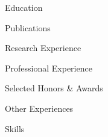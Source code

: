 \documentclass[11pt]{resume}
\begin{document}
\begin{rSection}{Education}
\end{rSection}

\begin{rSection}{Publications}
\end{rSection}


\begin{rSection}{Research Experience}
\end{rSection}

\begin{rSection}{Professional Experience}
\end{rSection}

\begin{rSection}{Selected Honors \& Awards}
\end{rSection}

\begin{rSection}{Other Experiences}
\end{rSection}

\begin{rSection}{Skills}
\end{rSection}
\end{document}
